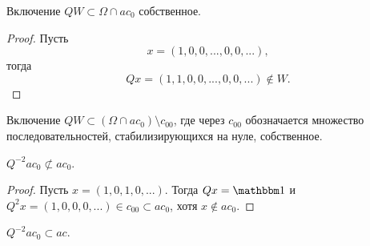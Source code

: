 \begin{lemma}
	Включение $QW\subset \Omega\cap ac_0$ собственное.
\end{lemma}

\begin{proof}
	Пусть
	\begin{equation}
		x = (1,0,0,...,0,0,...),
	\end{equation}
	тогда
	\begin{equation}
		Qx = (1,1,0,0,...,0,0,...) \notin W
		.
	\end{equation}
\end{proof}

\begin{hypothesis}
	Включение $QW\subset (\Omega\cap ac_0) \setminus c_{00}$, где через $c_{00}$ обозначается множество последовательностей,
	стабилизирующихся на нуле, собственное.
\end{hypothesis}

\begin{lemma}
	$Q^{-2} ac_0 \not \subset ac_0$.
\end{lemma}

\begin{proof}
	Пусть $x=(1,0,1,0,...)$.
	Тогда $Qx = \one$ и $Q^2 x = (1,0,0,0,...) \in c_{00} \subset ac_0$,
	хотя $x\notin ac_0$.
\end{proof}

\begin{hypothesis}
	$Q^{-2} ac_0 \subset ac$.
\end{hypothesis}
